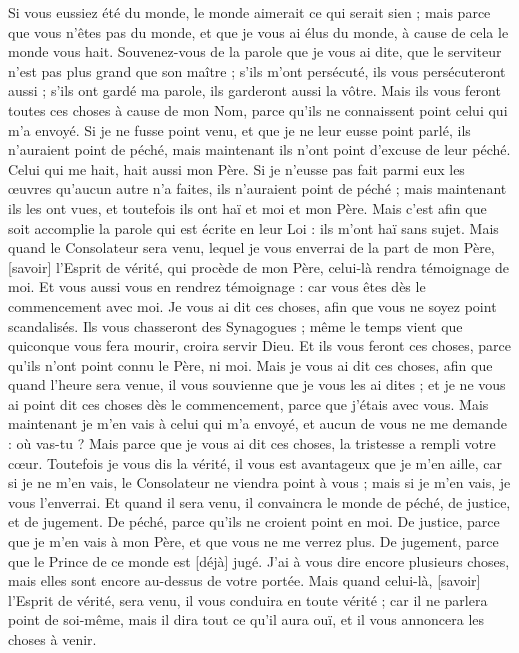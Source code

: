\begin{multicols}{2}
Si vous eussiez été du monde, le monde aimerait ce qui serait sien ; mais parce que vous n'êtes pas du monde, et que je vous ai élus du monde, à cause de cela le monde vous hait.
Souvenez-vous de la parole que je vous ai dite, que le serviteur n'est pas plus grand que son maître ; s'ils m'ont persécuté, ils vous persécuteront aussi ; s'ils ont gardé ma parole, ils garderont aussi la vôtre.
Mais ils vous feront toutes ces choses à cause de mon Nom, parce qu'ils ne connaissent point celui qui m'a envoyé.
Si je ne fusse point venu, et que je ne leur eusse point parlé, ils n'auraient point de péché, mais maintenant ils n'ont point d'excuse de leur péché.
Celui qui me hait, hait aussi mon Père.
Si je n'eusse pas fait parmi eux les œuvres qu'aucun autre n'a faites, ils n'auraient point de péché ; mais maintenant ils les ont vues, et toutefois ils ont haï et moi et mon Père.
Mais c'est afin que soit accomplie la parole qui est écrite en leur Loi : ils m'ont haï sans sujet.
Mais quand le Consolateur sera venu, lequel je vous enverrai de la part de mon Père, [savoir] l'Esprit de vérité, qui procède de mon Père, celui-là rendra témoignage de moi.
Et vous aussi vous en rendrez témoignage : car vous êtes dès le commencement avec moi.
\VerseOne{}Je vous ai dit ces choses, afin que vous ne soyez point scandalisés.
Ils vous chasseront des Synagogues ; même le temps vient que quiconque vous fera mourir, croira servir Dieu.
Et ils vous feront ces choses, parce qu'ils n'ont point connu le Père, ni moi.
Mais je vous ai dit ces choses, afin que quand l'heure sera venue, il vous souvienne que je vous les ai dites ; et je ne vous ai point dit ces choses dès le commencement, parce que j'étais avec vous.
Mais maintenant je m'en vais à celui qui m'a envoyé, et aucun de vous ne me demande : où vas-tu ?
Mais parce que je vous ai dit ces choses, la tristesse a rempli votre cœur.
Toutefois je vous dis la vérité, il vous est avantageux que je m'en aille, car si je ne m'en vais, le Consolateur ne viendra point à vous ; mais si je m'en vais, je vous l'enverrai.
Et quand il sera venu, il convaincra le monde de péché, de justice, et de jugement.
De péché, parce qu'ils ne croient point en moi.
De justice, parce que je m'en vais à mon Père, et que vous ne me verrez plus.
De jugement, parce que le Prince de ce monde est [déjà] jugé.
J'ai à vous dire encore plusieurs choses, mais elles sont encore au-dessus de votre portée.
Mais quand celui-là, [savoir] l'Esprit de vérité, sera venu, il vous conduira en toute vérité ; car il ne parlera point de soi-même, mais il dira tout ce qu'il aura ouï, et il vous annoncera les choses à venir.

\end{multicols}
